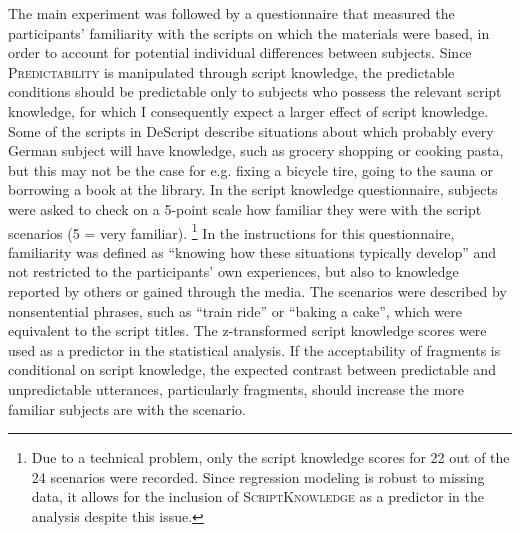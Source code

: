 The main experiment was followed by a questionnaire that measured the participants' familiarity with the scripts on which the materials were based, in order to account for potential individual differences between subjects. Since \textsc{Predictability} is manipulated through script knowledge, the predictable conditions should be predictable only to subjects who possess the relevant script knowledge, for which I consequently expect a larger effect of script knowledge. Some of the scripts in DeScript describe situations about which probably every German subject will have knowledge, such as grocery shopping or cooking pasta, but this may not be the case for e.g. fixing a bicycle tire, going to the sauna or borrowing a book at the library. In the script knowledge questionnaire, subjects were asked to check on a 5-point scale how familiar they were with the script scenarios (5 = very familiar).%
%
\footnote{Due to a technical problem, only the script knowledge scores for 22 out of the 24 scenarios were recorded. Since regression modeling is robust to missing data, it allows for the inclusion of \textsc{ScriptKnowledge} as a predictor in the analysis despite this issue.}\afterfn%
%
In the instructions for this questionnaire, familiarity was defined as ``knowing how these situations typically develop'' and not restricted to the participants' own experiences, but also to knowledge reported by others or gained through the media. The scenarios were described by nonsentential phrases, such as ``train ride'' or ``baking a cake'', which were equivalent to the script titles. The z-transformed script knowledge scores were used as a predictor in the statistical analysis. If the acceptability of fragments is conditional on script knowledge, the expected contrast between predictable and unpredictable utterances, particularly fragments, should increase the more familiar subjects are with the scenario.

